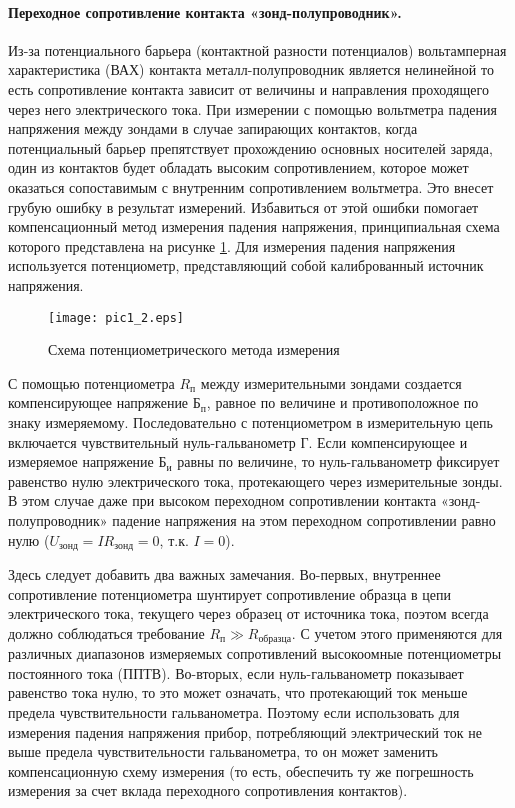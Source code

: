 \paragraph{Переходное сопротивление контакта «зонд-полупроводник».}
Из-за потенциального барьера (контактной разности потенциалов) вольтамперная характеристика (ВАХ) контакта металл-полупроводник является нелинейной то есть сопротивление контакта зависит от величины и направления проходящего через него электрического тока. При измерении с помощью вольтметра падения напряжения между зондами в случае запирающих контактов, когда потенциальный барьер препятствует прохождению основных носителей заряда, один из контактов будет обладать высоким сопротивлением, которое может оказаться сопоставимым с внутренним сопротивлением вольтметра. Это внесет грубую ошибку в результат измерений. Избавиться от этой ошибки помогает компенсационный метод измерения падения напряжения, принципиальная схема которого представлена на рисунке \ref{1_potenc}. Для измерения падения напряжения используется потенциометр, представляющий собой калиброванный источник напряжения.

\begin{figure}[h!]\centering
\texttt{[image: pic1\_2.eps]}
\caption{Схема потенциометрического метода измерения}
\label{1_potenc}
\end{figure}

С помощью потенциометра $R_{\text{п}}$ между измерительными зондами создается компенсирующее напряжение $\text{Б}_{\text{п}}$, равное по величине и противоположное по знаку измеряемому. Последовательно с потенциометром в измерительную цепь включается чувствительный нуль-гальванометр Г. Если компенсирующее и измеряемое напряжение $\text{Б}_{\text{и}}$ равны по величине, то нуль-гальванометр фиксирует равенство нулю электрического тока, протекающего через измерительные зонды. В этом случае даже при высоком переходном сопротивлении контакта «зонд-полупроводник» падение напряжения на этом переходном сопротивлении равно нулю ($U_{\text{зонд}} = I R_{\text{зонд}} = 0$, т.к. $I = 0$).

Здесь следует добавить два важных замечания. Во-первых, внутреннее сопротивление потенциометра шунтирует сопротивление образца в цепи электрического тока, текущего через образец от источника тока, поэтом всегда должно соблюдаться требование $R_{\text{п}} \gg R_{\text{образца}}$. С учетом этого применяются для различных диапазонов измеряемых сопротивлений высокоомные потенциометры постоянного тока (ППТВ). Во-вторых, если нуль-гальванометр показывает равенство тока нулю, то это может означать, что протекающий ток меньше предела чувствительности гальванометра. Поэтому если использовать для измерения падения напряжения прибор, потребляющий электрический ток не выше предела чувствительности гальванометра, то он может заменить компенсационную схему измерения (то есть, обеспечить ту же погрешность измерения за счет вклада переходного сопротивления контактов).

